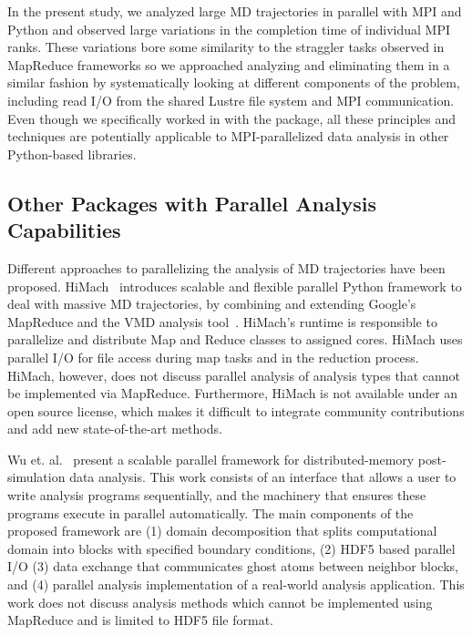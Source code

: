 In the present study, we analyzed large MD trajectories in parallel with MPI and Python and observed large variations in the completion time of individual MPI ranks.
These variations bore some similarity to the straggler tasks observed in MapReduce frameworks so we approached analyzing and eliminating them in a similar fashion by systematically looking at different components of the problem, including read I/O from the shared Lustre file system and MPI communication.
Even though we specifically worked in with the  package, all these principles and techniques are potentially applicable to MPI-parallelized data analysis in other Python-based libraries.


\subsection{Other Packages with Parallel Analysis Capabilities}
\label{sec:otherparallel}

Different approaches to parallelizing the analysis of MD trajectories have been proposed.
HiMach~\cite{himach-2008} introduces scalable and flexible parallel Python framework to deal with massive MD trajectories, by combining and extending Google's MapReduce and the VMD analysis tool~\cite{Hum96}. 
HiMach's runtime is responsible to parallelize and distribute Map and Reduce classes to assigned cores.
HiMach uses parallel I/O for file access during map tasks and  in the reduction process. 
HiMach, however, does not discuss parallel analysis of analysis types that cannot be implemented via MapReduce.
Furthermore, HiMach is not available under an open source license, which makes it difficult to integrate community contributions and add new state-of-the-art methods.

Wu et. al.~\cite{Wu_et.al} present a scalable parallel framework for distributed-memory post-simulation data analysis.
This work consists of an interface that allows a user to write analysis programs sequentially, and the machinery that ensures these programs execute in parallel automatically. 
The main components of the proposed framework are (1) domain decomposition that splits computational domain into blocks with specified boundary conditions, (2) HDF5 based parallel I/O (3) data exchange that communicates ghost atoms between neighbor blocks, and (4) parallel analysis implementation of a real-world analysis application.
This work does not discuss analysis methods which cannot be implemented using MapReduce and is limited to HDF5 file format.

